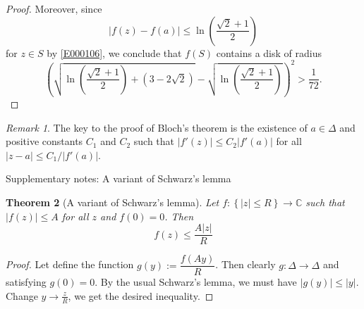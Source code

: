 \documentclass[11pt]{amsart}
\newtheorem{thm}{Theorem}[section]
\theoremstyle{remark}
\newtheorem{rem}[thm]{Remark}
\theoremstyle{definition}
\numberwithin{equation}{section}
\begin{document}
\begin{proof}
    Moreover, since
    \begin{equation}\label{E000109}
        |f(z) - f(a)| \le \ln\left(\frac{\sqrt{2}+1}{2}\right)
    \end{equation}
    for $z\in S$ by \eqref{E000106}, we conclude that $f(S)$ contains a disk of radius
    \begin{equation}\label{E000112}
        \left(\sqrt{\ln\left(\frac{\sqrt{2}+1}{2}\right) + (3 - 2\sqrt{2})}
        - \sqrt{\ln\left(\frac{\sqrt{2}+1}{2}\right)}\right)^2 > \frac{1}{72}.
    \end{equation}
\end{proof}

\begin{rem}\label{REM000900}
    The key to the proof of Bloch's theorem is the existence of $a\in \Delta$ and positive constants $C_1$ and $C_2$ such that
    $|f'(z)| \le C_2 |f'(a)|$ for all $|z-a| \le C_1/|f'(a)|$.
\end{rem}

Supplementary notes: A variant of Schwarz's lemma
\begin{thm}[A variant of Schwarz's lemma]

    Let $f \colon \left\lbrace |z| \le R \right\rbrace  \to \mathbb{C}$ such that $|f(z)| \le A$ for all $z$ and $f(0)=0$.
    Then
    \[f(z) \le \dfrac{A|z|}{R}\]
\end{thm}
\begin{proof}
    Let define the function $g(y):=\dfrac{f(Ay)}{R}$. Then clearly $g \colon \Delta \to \Delta$ and
    satisfying $g(0)=0$. By the usual Schwarz's lemma, we must have $|g(y)| \le |y|$. Change $y \to \frac{z}{R}$, we get the desired inequality.
\end{proof}
\end{document}
